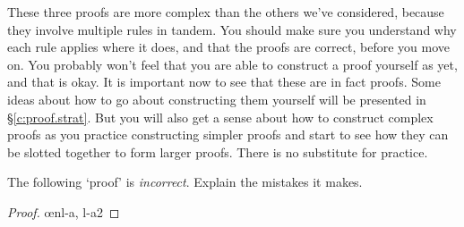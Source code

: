 These three proofs are more complex than the others we've considered, because they involve multiple rules in tandem. You should make sure you understand why each rule applies where it does, and that the proofs are correct, before you move on. You probably won't feel that you are able to construct a proof yourself as yet, and that is okay. It is important now to see that these are in fact proofs. Some ideas about how to go about constructing them yourself will be presented in §\ref{c:proof.strat}. But you will also get a sense about how to construct complex proofs as you practice constructing simpler proofs and start to see how they can be slotted together to form larger proofs. There is no substitute for practice.


\newpage
\practiceproblems

\problempart
The following `proof' is \emph{incorrect}. Explain the mistakes it makes.

\begin{proof}
\open
\close
\open
	\open
	\close
\close
{}\oe{nl-a, l-a2}
\end{proof}


